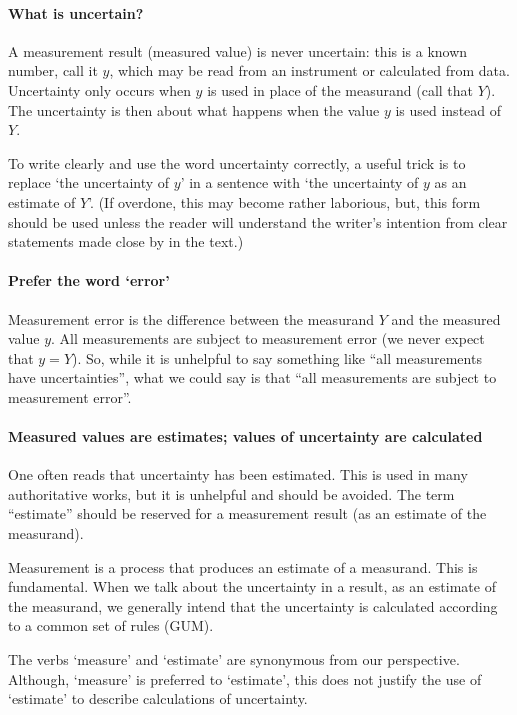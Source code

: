 \paragraph{What is uncertain?}
A measurement result (measured value) is never uncertain: this is a known number, call it $y$, which may be read from an instrument or calculated from data. Uncertainty only occurs when $y$ is used in place of the measurand (call that $Y$). The uncertainty is then about what happens when the value $y$ is used instead of $Y$. 

To write clearly and use the word uncertainty correctly, a useful trick is to replace `the uncertainty of $y$' in a sentence with `the uncertainty of $y$ as an estimate of $Y$'. (If overdone, this may become rather laborious, but, this form should be used unless the reader will understand the writer's intention from clear statements made close by in the text.) 

\paragraph{Prefer the word `error'} 
Measurement error is the difference between the measurand $Y$ and the measured value $y$. All measurements are subject to measurement error (we never expect that $y=Y$). So, while it is unhelpful to say something like ``all measurements have uncertainties'', what we could say is that ``all measurements are subject to measurement error''.

\paragraph{Measured values are estimates; values of uncertainty are calculated}

One often reads that uncertainty has been estimated. This is used in many authoritative works, but it is unhelpful and should be avoided. The term ``estimate'' should be reserved for a measurement result (as an estimate of the measurand). 

Measurement is a process that produces an estimate of a measurand. This is fundamental. When we talk about the uncertainty in a result, as an estimate of the measurand, we generally intend that the uncertainty is calculated according to a common set of rules (GUM). 

The verbs `measure' and `estimate' are synonymous from our perspective. Although, `measure' is preferred to `estimate', this does not justify the use of `estimate' to describe calculations of uncertainty.  


